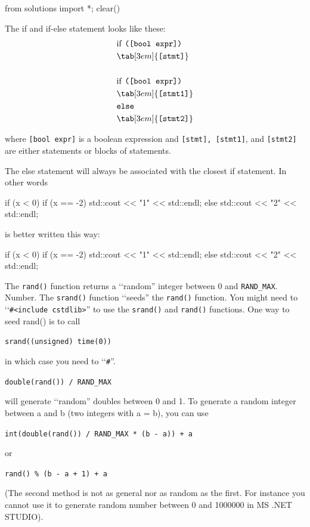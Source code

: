 \begin{python0}
from solutions import *; clear()
\end{python0}

The if and if-else statement looks like these:
\begin{align*}
&\text{if \texttt{([bool expr])}}\\
&\tab[3em]{\texttt{[stmt]}}\\\\
&\text{if \texttt{([bool expr])}}\\
&\tab[3em]{\texttt{[stmt1]}}\\
&\texttt{else}\\
&\tab[3em]{\texttt{[stmt2]}}\\
\end{align*}

where \texttt{[bool expr]} is a boolean expression and
\texttt{[stmt], [stmt1]}, and \texttt{[stmt2]} are either
statements or blocks of statements.

The else statement will always be associated with the closest if
statement. In other words
\begin{console}
if (x < 0)
   if (x == -2) std::cout << "1" << std::endl;
else
      std::cout << "2" << std::endl;
\end{console}

is better written this way:
\begin{console}
if (x < 0)
   if (x == -2)
       std::cout << "1" << std::endl;
   else
       std::cout << "2" << std::endl;
\end{console}

The \texttt{rand()} function returns a \lq\lq random'' integer between 0 and
\texttt{RAND\_MAX}. Number. The \texttt{srand()} function \lq\lq seeds'' the
\texttt{rand()} function. You might need to \lq\lq \texttt{\#<include
 cstdlib>}'' to use the \texttt{srand()} and
\texttt{rand()} functions. One way to seed rand() is to call
\begin{center}
\texttt{srand((unsigned) time(0))}
\end{center}
in which case you need to \lq\lq \texttt{\#<include  ctime>}''.
\begin{center}
\texttt{double(rand()) / RAND\_MAX}
\end{center}
will generate \lq\lq random'' doubles between 0 and 1. To generate a random
integer between a and b (two integers with a = b), you can use
\begin{center}
\texttt{int(double(rand()) / RAND\_MAX * (b - a)) + a}
\end{center}
or
\begin{center}
\texttt{rand() \% (b - a + 1) + a}
\end{center}
(The second method is not as general nor as random as the first. For
instance you cannot use it to generate random number between 0 and
1000000 in MS .NET STUDIO).

